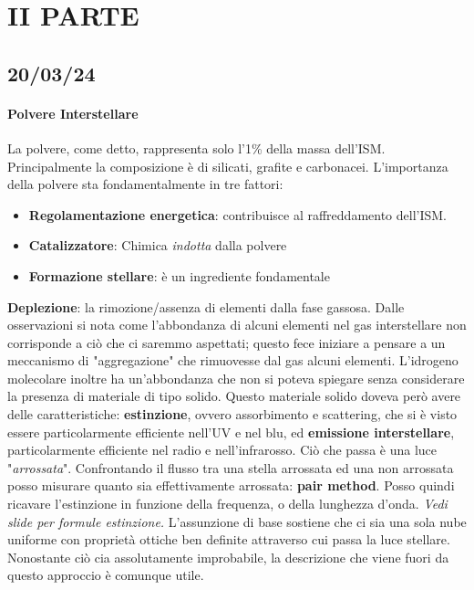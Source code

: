 \chapter{II PARTE}

\section{20/03/24}

\subsubsection{Polvere Interstellare}
La polvere, come detto, rappresenta solo l'1\% della massa dell'ISM. 
Principalmente la composizione è di silicati, grafite e carbonacei.
L'importanza della polvere sta fondamentalmente in tre fattori:
\begin{itemize}
    \item \textbf{Regolamentazione energetica}:
    contribuisce al raffreddamento dell'ISM.
    \item \textbf{Catalizzatore}:
    Chimica \textit{indotta} dalla polvere
    \item \textbf{Formazione stellare}:
    è un ingrediente fondamentale
\end{itemize}
\textbf{Deplezione}: la rimozione/assenza di elementi dalla fase gassosa. Dalle osservazioni si nota come l'abbondanza di alcuni elementi nel gas interstellare non corrisponde a ciò che ci saremmo aspettati; questo fece iniziare a pensare a un meccanismo di "aggregazione" che rimuovesse dal gas alcuni elementi. 
L'idrogeno molecolare inoltre ha un'abbondanza che non si poteva spiegare senza considerare la presenza di materiale di tipo solido.
Questo materiale solido doveva però avere delle caratteristiche: \textbf{estinzione}, ovvero assorbimento e scattering, che si è visto essere particolarmente efficiente nell'UV e nel blu, ed \textbf{emissione interstellare}, particolarmente efficiente nel radio e nell'infrarosso.
Ciò che passa è una luce "\textit{arrossata}".
Confrontando il flusso tra una stella arrossata ed una non arrossata posso misurare quanto sia effettivamente arrossata: \textbf{pair method}.
Posso quindi ricavare l'estinzione in funzione della frequenza, o della lunghezza d'onda.
\textit{Vedi slide per formule estinzione.}
L'assunzione di base sostiene che ci sia una sola nube uniforme con proprietà ottiche ben definite attraverso cui passa la luce stellare. Nonostante ciò cia assolutamente improbabile, la descrizione che viene fuori da questo approccio è comunque utile.
